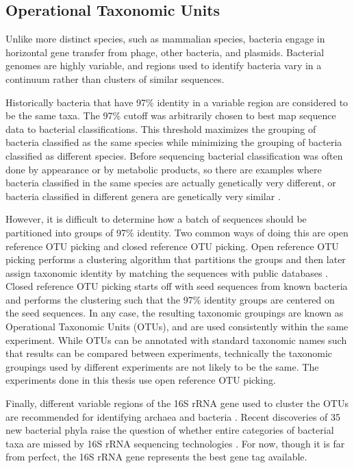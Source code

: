 \subsection{Operational Taxonomic Units}
Unlike more distinct species, such as mammalian species, bacteria engage in horizontal gene transfer from phage, other bacteria, and plasmids. Bacterial genomes are highly variable, and regions used to identify bacteria vary in a continuum rather than clusters of similar sequences.

Historically bacteria that have 97\% identity in a variable region are considered to be the same taxa. The 97\% cutoff was arbitrarily chosen to best map sequence data to bacterial classifications. This threshold maximizes the grouping of bacteria classified as the same species while minimizing the grouping of bacteria classified as different species. Before sequencing bacterial classification was often done by appearance or by metabolic products, so there are examples where bacteria classified in the same species are actually genetically very different, or bacteria classified in different genera are genetically very similar \cite{ciccarelli2006toward}.

However, it is difficult to determine how a batch of sequences should be partitioned into groups of 97\% identity. Two common ways of doing this are open reference OTU picking \cite{rideout2014subsampled} and closed reference OTU picking. Open reference OTU picking performs a clustering algorithm that partitions the groups and then later assign taxonomic identity by matching the sequences with public databases \cite{edgar2013uparse}. Closed reference OTU picking starts off with seed sequences from known bacteria and performs the clustering such that the 97\% identity groups are centered on the seed sequences. In any case, the resulting taxonomic groupings are known as Operational Taxonomic Units (OTUs), and are used consistently within the same experiment. While OTUs can be annotated with standard taxonomic names such that results can be compared between experiments, technically the taxonomic groupings used by different experiments are not likely to be the same. The experiments done in this thesis use open reference OTU picking.

Finally, different variable regions of the 16S rRNA gene used to cluster the OTUs are recommended for identifying archaea and bacteria \cite{kim2011evaluation}. Recent discoveries of 35 new bacterial phyla raise the question of whether entire categories of bacterial taxa are missed by 16S rRNA sequencing technologies \cite{hug2016new}. For now, though it is far from perfect, the 16S rRNA gene represents the best gene tag available.

